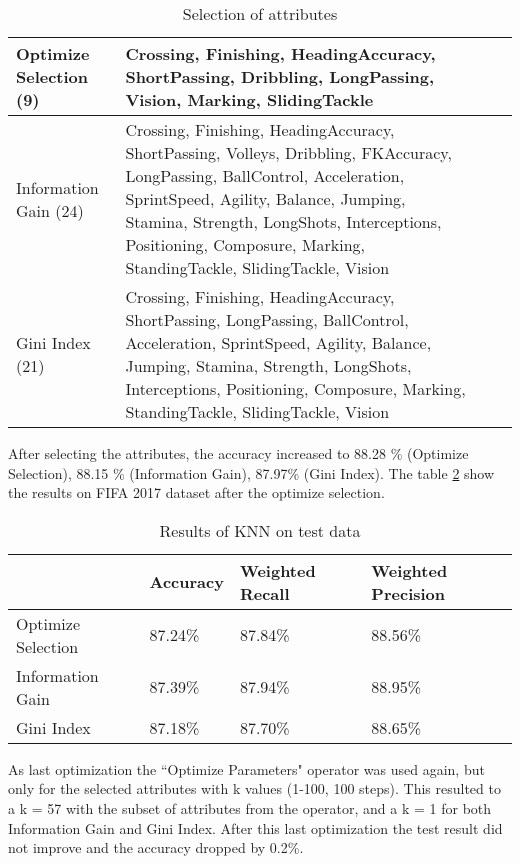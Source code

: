 \begin{table}[]
\begin{tabular}{p{3.5cm}|p{7.5cm}l|l}
\hline 
Optimize Selection (9) & Crossing, Finishing, HeadingAccuracy, ShortPassing, Dribbling, LongPassing, Vision, Marking, SlidingTackle \vspace{0.5cm}\\ 
\hline 
Information Gain (24)& Crossing, Finishing, HeadingAccuracy, ShortPassing, Volleys, Dribbling, FKAccuracy, LongPassing, BallControl, Acceleration, SprintSpeed, Agility, Balance, Jumping, Stamina, Strength, LongShots, Interceptions, Positioning, Composure, Marking, StandingTackle, SlidingTackle, Vision \vspace{0.5cm}\\ 
\hline 
Gini Index (21) & Crossing, Finishing, HeadingAccuracy, ShortPassing, LongPassing, BallControl, Acceleration, SprintSpeed, Agility, Balance, Jumping, Stamina, Strength, LongShots, Interceptions, Positioning, Composure, Marking, StandingTackle, SlidingTackle, Vision\\ \hline
\end{tabular}
\label{tab:knn2}
\caption{Selection of attributes}
\end{table}	
After selecting the attributes, the accuracy increased to 88.28 \% (Optimize Selection), 88.15 \% (Information Gain), 87.97\% (Gini Index). The table \ref{tab:KNNResults} show the results on FIFA 2017 dataset after the optimize selection.

\begin{table}[]
\begin{tabular}{@{}llll@{}}
\toprule
                                        & Accuracy & Weighted Recall & Weighted Precision \\ \midrule
\multicolumn{1}{l|}{Optimize Selection} & 87.24\%  & 87.84\%         & 88.56\%            \\
\multicolumn{1}{l|}{Information Gain}          & 87.39\%  & 87.94\%         & 88.95\%            \\
\multicolumn{1}{l|}{Gini Index}         & 87.18\%  & 87.70\%         & 88.65\%            \\ \bottomrule
\end{tabular}
\label{tab:KNNResults}
\caption{Results of KNN on test data}
\end{table}

As last optimization the ``Optimize Parameters" operator was used again, but only for the selected attributes with k values (1-100, 100 steps). This resulted to a k = 57 with the subset of attributes from the operator, and a k = 1 for both Information Gain and Gini Index. After this last optimization the test result did not improve and the accuracy dropped by 0.2\%.
%
%
